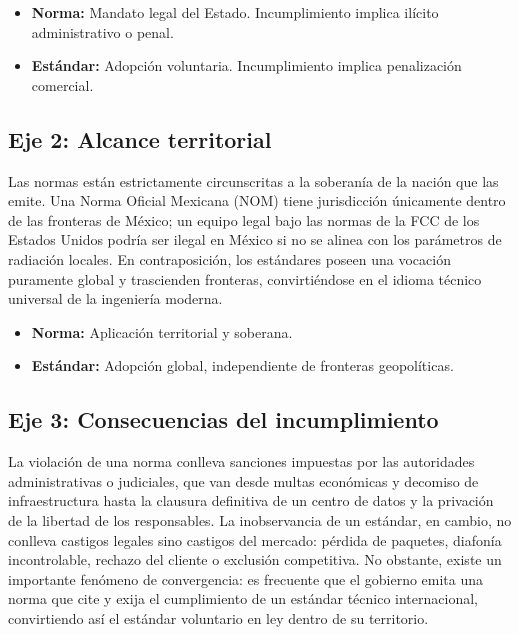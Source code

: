 \documentclass[a4paper,12pt]{article}
\begin{document}
\begin{itemize}
    \item \textbf{Norma:} Mandato legal del Estado. Incumplimiento implica ilícito administrativo o penal.
    \item \textbf{Estándar:} Adopción voluntaria. Incumplimiento implica penalización comercial.
\end{itemize}

\subsection*{Eje 2: Alcance territorial}

Las normas están estrictamente circunscritas a la soberanía de la nación que las emite. Una Norma Oficial Mexicana (NOM) tiene jurisdicción únicamente dentro de las fronteras de México; un equipo legal bajo las normas de la FCC de los Estados Unidos podría ser ilegal en México si no se alinea con los parámetros de radiación locales. En contraposición, los estándares poseen una vocación puramente global y trascienden fronteras, convirtiéndose en el idioma técnico universal de la ingeniería moderna.

\begin{itemize}
    \item \textbf{Norma:} Aplicación territorial y soberana.
    \item \textbf{Estándar:} Adopción global, independiente de fronteras geopolíticas.
\end{itemize}

\subsection*{Eje 3: Consecuencias del incumplimiento}

La violación de una norma conlleva sanciones impuestas por las autoridades administrativas o judiciales, que van desde multas económicas y decomiso de infraestructura hasta la clausura definitiva de un centro de datos y la privación de la libertad de los responsables. La inobservancia de un estándar, en cambio, no conlleva castigos legales sino castigos del mercado: pérdida de paquetes, diafonía incontrolable, rechazo del cliente o exclusión competitiva. No obstante, existe un importante fenómeno de convergencia: es frecuente que el gobierno emita una norma que cite y exija el cumplimiento de un estándar técnico internacional, convirtiendo así el estándar voluntario en ley dentro de su territorio.
\end{document}
